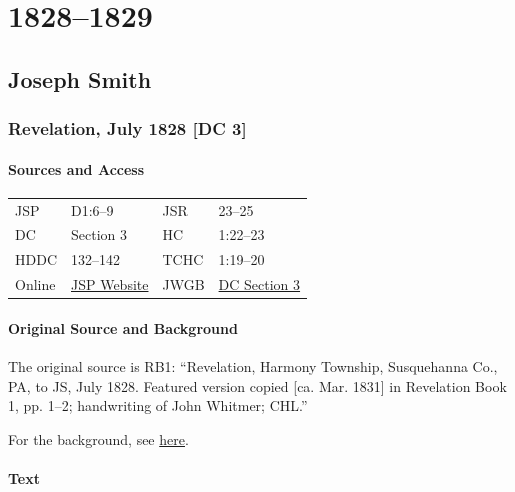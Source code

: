 \section{1828--1829}
	\label{EMS-1828-1829}

	\subsection{Joseph Smith}
		\label{EMS-1828-1829-JS}
	
		\subsubsection{Revelation, July 1828 [DC 3]}
			\label{EMS-1828-1829-JS-JUL-1828}
		
			\paragraph{Sources and Access}

				\begin{tabular}{p{1in}p{1.5in}p{1in}p{1.5in}}
				JSP	 	& D1:6--9 		& JSR 		& 23--25	 \\  
				DC	 	& Section 3 	& HC 		& 1:22--23	 \\
				HDDC 	& 132--142 		& TCHC 		& 1:19--20	 \\
				Online  & \href{https://www.josephsmithpapers.org/paper-summary/revelation-july-1828-dc-3/1}{JSP Website} & 
				JWGB	& \hyperref[DC3]{DC Section 3} \\
				\end{tabular}
			
			\paragraph{Original Source and Background}
			
				The original source is RB1: ``Revelation, Harmony Township, Susquehanna Co., PA, to JS, July 1828. Featured version copied [ca. Mar. 1831] in Revelation Book 1, pp. 1--2; handwriting of John Whitmer; CHL.''
				
				For the background, see \hyperref[DC3-HB]{here}.
			
			\paragraph{Text}
			

